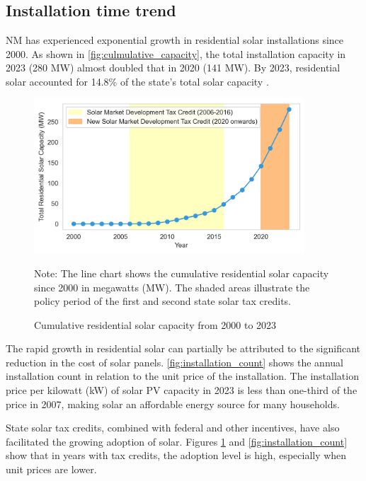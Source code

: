 \documentclass[12pt,twoside,letterpaper]{article}
\begin{document}
\subsection{Installation time trend}
 
NM has experienced exponential growth in residential solar installations since 2000. As shown in \autoref{fig:culmulative_capacity}, the total installation capacity in 2023 (280 MW) almost doubled that in 2020 (141 MW). By 2023, residential solar accounted for 14.8\% of the state’s total solar capacity \parencite{seia2023nm}.

\begin{figure}[!ht]
    \centering
\includegraphics[width=0.9\textwidth]{figures/cumulative_capacity.png}
    \caption{Cumulative residential solar capacity from 2000 to 2023}
    \label{fig:culmulative_capacity}
    \begin{flushleft}
        \footnotesize Note: The line chart shows the cumulative residential solar capacity since 2000 in megawatts (MW). The shaded areas illustrate the policy period of the first and second state solar tax credits.  
    \end{flushleft}
    
\end{figure}


The rapid growth in residential solar can partially be attributed to the significant reduction in the cost of solar panels. \autoref{fig:installation_count} shows the annual installation count in relation to the unit price of the installation. The installation price per kilowatt (kW) of solar PV capacity in 2023 is less than one-third of the price in 2007, making solar an affordable energy source for many households.

State solar tax credits, combined with federal and other incentives, have also facilitated the growing adoption of solar. Figures \ref{fig:culmulative_capacity} and \ref{fig:installation_count} show that in years with tax credits, the adoption level is high, especially when unit prices are lower.
\end{document}
